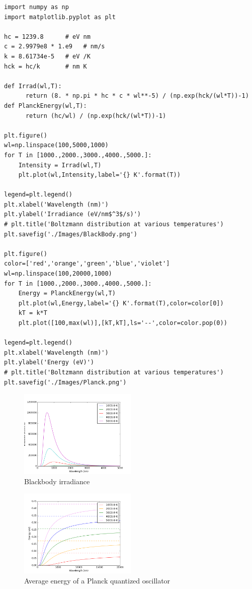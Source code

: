 \documentclass[11pt]{article}
\begin{document}
\begin{verbatim}
import numpy as np
import matplotlib.pyplot as plt

hc = 1239.8      # eV nm
c = 2.9979e8 * 1.e9   # nm/s
k = 8.61734e-5   # eV /K
hck = hc/k       # nm K

def Irrad(wl,T):
      return (8. * np.pi * hc * c * wl**-5) / (np.exp(hck/(wl*T))-1)
def PlanckEnergy(wl,T):
      return (hc/wl) / (np.exp(hck/(wl*T))-1)

plt.figure()
wl=np.linspace(100,5000,1000)
for T in [1000.,2000.,3000.,4000.,5000.]:
    Intensity = Irrad(wl,T)
    plt.plot(wl,Intensity,label='{} K'.format(T))

legend=plt.legend()
plt.xlabel('Wavelength (nm)')
plt.ylabel('Irradiance (eV/nm$^3$/s)')
# plt.title('Boltzmann distribution at various temperatures')
plt.savefig('./Images/BlackBody.png')

plt.figure()
color=['red','orange','green','blue','violet']
wl=np.linspace(100,20000,1000)
for T in [1000.,2000.,3000.,4000.,5000.]:
    Energy = PlanckEnergy(wl,T)
    plt.plot(wl,Energy,label='{} K'.format(T),color=color[0])
    kT = k*T
    plt.plot([100,max(wl)],[kT,kT],ls='--',color=color.pop(0))

legend=plt.legend()
plt.xlabel('Wavelength (nm)')
plt.ylabel('Energy (eV)')
# plt.title('Boltzmann distribution at various temperatures')
plt.savefig('./Images/Planck.png')
\end{verbatim}

\begin{figure}[htbp]
\centering
\includegraphics[width=0.5\textwidth]{./Images/BlackBody.png}
\caption{Blackbody irradiance}
\end{figure}
\begin{figure}[htbp]
\centering
\includegraphics[width=0.5\textwidth]{./Images/Planck.png}
\caption{Average energy of a Planck quantized oscillator}
\end{figure}
\end{document}
